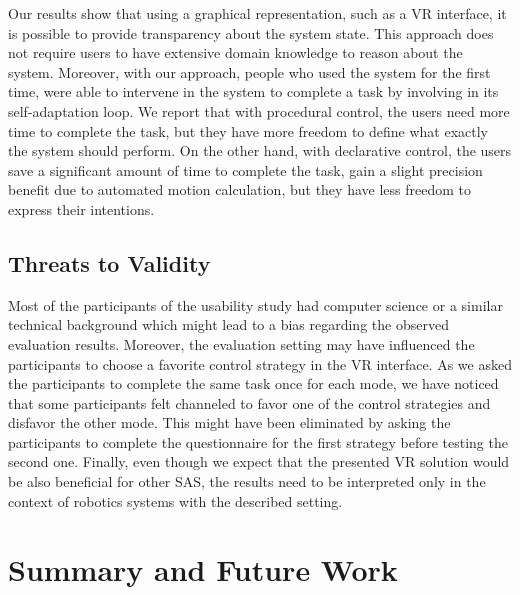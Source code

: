 \documentclass[10pt, conference]{IEEEtran}
\begin{document}
Our results show that using a graphical representation, such as a VR interface, it is possible to provide transparency about the system state. This approach does not require users to have extensive domain knowledge to reason about the system. Moreover, with our approach, people who used the system for the first time, were able to intervene in the system to complete a task by involving in its self-adaptation loop. We report that with procedural control, the users need more time to complete the task, but they have more freedom to define what exactly the system should perform. On the other hand, with declarative control, the users save a significant amount of time to complete the task, gain a slight precision benefit due to automated motion calculation, but they have less freedom to express their intentions.

\subsection{Threats to Validity}
\label{evalThreats}

Most of the participants of the usability study had computer science or a similar technical background which might lead to a bias regarding the observed evaluation results. Moreover, the evaluation setting may have influenced the participants to choose a favorite control strategy in the VR interface. As we asked the participants to complete the same task once for each mode, we have noticed that some participants felt channeled to favor one of the control strategies and disfavor the other mode. This might have been eliminated by asking the participants to complete the questionnaire for the first strategy before testing the second one. Finally, even though we expect that the presented VR solution would be also beneficial for other SAS, the results need to be interpreted only in the context of robotics systems with the described setting.   

\section{Summary and Future Work}
\label{sum}
\end{document}
